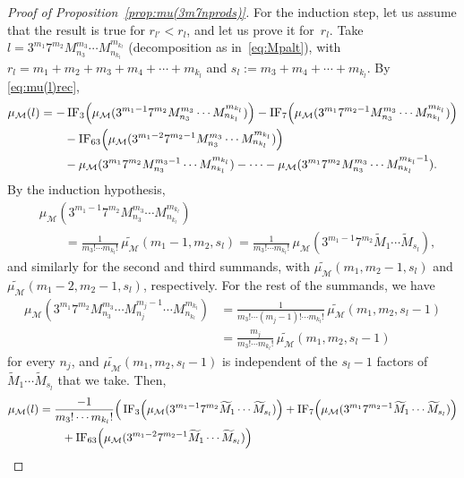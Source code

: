 \documentclass[11pt, a4paper]{article}
\newcommand{\calM}{\mathcal{M}}
\newcommand{\muM}{\mu_\calM}
\newcommand{\IF}{\operatorname{IF}}
\theoremstyle{plain}
\theoremstyle{definition}
\begin{document}
\begin{proof}[Proof of Proposition~\ref{prop:mu(3m7nprods)}]
For the induction step, let us assume that the result is true for $r_{l'} < r_l$, and let us prove it for~$r_l$.
Take $l = 3^{m_1} 7^{m_2} M_{n_3}^{m_3} \cdots M_{n_{k_l}}^{m_{k_l}}$ (decomposition as in~\eqref{eq:Mpalt}),
with $r_l = m_1 + m_2 + m_3 + m_4 + \cdots + m_{k_l}$ and $s_l := m_3 + m_4 + \cdots + m_{k_l}$.
By \eqref{eq:mu(l)rec},
\begin{align*}
  \muM(l) &= -\IF_3\Bigl(\muM(3^{m_1-1} 7^{m_2} M_{n_3}^{m_3} \cdots M_{n_{k_l}}^{m_{k_l}})\Bigr)
  - \IF_7\Bigl(\muM(3^{m_1} 7^{m_2-1} M_{n_3}^{m_3} \cdots M_{n_{k_l}}^{m_{k_l}})\Bigr) \\
  &\qquad - \IF_{63}\Bigl(\muM(3^{m_1-2} 7^{m_2-1} M_{n_3}^{m_3} \cdots M_{n_{k_l}}^{m_{k_l}})\Bigr) \\
  &\qquad - \muM(3^{m_1} 7^{m_2} M_{n_3}^{m_3-1} \cdots M_{n_{k_l}}^{m_{k_l}})
  - \cdots - \muM(3^{m_1} 7^{m_2} M_{n_3}^{m_3} \cdots M_{n_{k_l}}^{m_{k_l}-1}).
\end{align*}
By the induction hypothesis,
\begin{align*}
  &\muM(3^{m_1-1} 7^{m_2} M_{n_3}^{m_3} \cdots M_{n_{k_l}}^{m_{k_l}}) \\
  &\qquad = \frac{1}{m_3!\cdots m_{k_l}!} \,\widetilde{\muM}(m_1-1,m_2,s_l)
  = \frac{1}{m_3!\cdots m_{k_l}!} \,\muM(3^{m_1-1}7^{m_2} \widetilde{M}_{1} \cdots \widetilde{M}_{s_l}),
\end{align*}
and similarly for the second and third summands, with 
$\widetilde{\muM}(m_1,\allowbreak m_2-1,\allowbreak s_l)$ and $\widetilde{\muM}(m_1-2,\allowbreak m_2-1,\allowbreak s_l)$, respectively.
For the rest of the summands, we have 
\begin{align*}
  \muM(3^{m_1} 7^{m_2} M_{n_3}^{m_3} \cdots M_{n_j}^{m_j-1} \cdots M_{n_{k_l}}^{m_{k_l}}) 
  &= \frac{1}{m_3!\cdots (m_j-1)! \cdots m_{k_l}!} \,\widetilde{\muM}(m_1,m_2,s_l-1) \\
  &= \frac{m_j}{m_3! \cdots m_{k_l}!} \,\widetilde{\muM}(m_1,m_2,s_l-1)
\end{align*}
for every $n_j$, and $\widetilde{\muM}(m_1,m_2,s_l-1)$ is independent of the $s_l-1$ factors 
of $\widetilde{M}_{1} \cdots \widetilde{M}_{s_l}$ that we take. 
Then,
\begin{align*}
  \muM(l) &= \frac{-1}{m_3! \cdots m_{k_l}!} \Big(
  \IF_3\Bigl(\muM(3^{m_1-1} 7^{m_2} \widetilde{M}_{1} \cdots \widetilde{M}_{s_l})\Bigr)
  + \IF_7\Bigl(\muM(3^{m_1} 7^{m_2-1} \widetilde{M}_{1} \cdots \widetilde{M}_{s_l})\Bigr) \\
  &\qquad + \IF_{63}\Bigl(\muM(3^{m_1-2} 7^{m_2-1} \widetilde{M}_{1} \cdots \widetilde{M}_{s_l})\Bigr) \\

\end{align*}
\end{proof}
\end{document}
